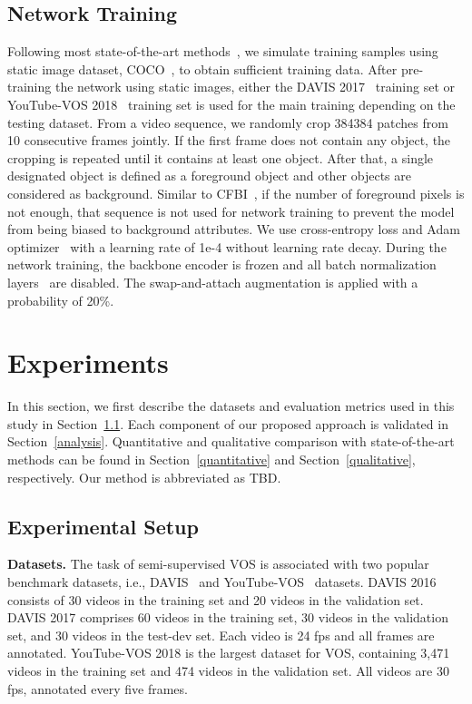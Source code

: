 \documentclass[runningheads]{llncs}
\begin{document}
\subsection{Network Training}
Following most state-of-the-art methods~\cite{STM, KMN, AFB-URR, RMNet, LCM}, we simulate training samples using static image dataset, COCO~\cite{COCO}, to obtain sufficient training data. After pre-training the network using static images, either the DAVIS 2017~\cite{DAVIS2017} training set or YouTube-VOS 2018~\cite{YTVOS} training set is used for the main training depending on the testing dataset. From a video sequence, we randomly crop 384384 patches from 10 consecutive frames jointly. If the first frame does not contain any object, the cropping is repeated until it contains at least one object. After that, a single designated object is defined as a foreground object and other objects are considered as background. Similar to CFBI~\cite{CFBI}, if the number of foreground pixels is not enough, that sequence is not used for network training to prevent the model from being biased to background attributes. We use cross-entropy loss and Adam optimizer~\cite{adam} with a learning rate of 1e-4 without learning rate decay. During the network training, the backbone encoder is frozen and all batch normalization layers~\cite{batchnorm} are disabled. The swap-and-attach augmentation is applied with a probability of 20\%.



\section{Experiments}
In this section, we first describe the datasets and evaluation metrics used in this study in Section~\ref{setup}. Each component of our proposed approach is validated in Section~\ref{analysis}. Quantitative and qualitative comparison with state-of-the-art methods can be found in Section~\ref{quantitative} and Section~\ref{qualitative}, respectively. Our method is abbreviated as TBD.



\subsection{Experimental Setup}
\label{setup}
\noindent\textbf{Datasets.} The task of semi-supervised VOS is associated with two popular benchmark datasets, i.e., DAVIS~\cite{DAVIS2016, DAVIS2017} and YouTube-VOS~\cite{YTVOS} datasets. DAVIS 2016 consists of 30 videos in the training set and 20 videos in the validation set. DAVIS 2017 comprises 60 videos in the training set, 30 videos in the validation set, and 30 videos in the test-dev set. Each video is 24 fps and all frames are annotated. YouTube-VOS 2018 is the largest dataset for VOS, containing 3,471 videos in the training set and 474 videos in the validation set. All videos are 30 fps, annotated every five frames.
\end{document}

